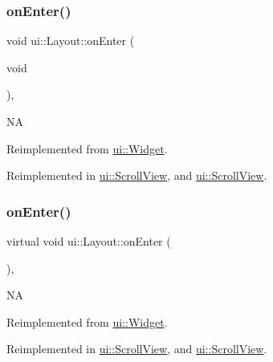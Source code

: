 \subsubsection{\texorpdfstring{on\+Enter()}{onEnter()}\hspace{0.1cm}{\footnotesize\ttfamily [1/2]}}
{\footnotesize\ttfamily void ui\+::\+Layout\+::on\+Enter (\begin{DoxyParamCaption}\item[{void}]{ }\end{DoxyParamCaption})\hspace{0.3cm}{\ttfamily [override]}, {\ttfamily [virtual]}}

NA 

Reimplemented from \hyperlink{classui_1_1Widget_a9cda9b9ffbf77a8ed695e6b97b9a46cc}{ui\+::\+Widget}.



Reimplemented in \hyperlink{classui_1_1ScrollView_afeb85b1cf1e420b57a66c97c08763138}{ui\+::\+Scroll\+View}, and \hyperlink{classui_1_1ScrollView_a1fb1c9ad9108d8c0102af82bfb7ef66d}{ui\+::\+Scroll\+View}.

\mbox{\label{classui_1_1Layout_ad3edf411791596999e99059861c0097a}} 
\subsubsection{\texorpdfstring{on\+Enter()}{onEnter()}\hspace{0.1cm}{\footnotesize\ttfamily [2/2]}}
{\footnotesize\ttfamily virtual void ui\+::\+Layout\+::on\+Enter (\begin{DoxyParamCaption}{ }\end{DoxyParamCaption})\hspace{0.3cm}{\ttfamily [override]}, {\ttfamily [virtual]}}

NA 

Reimplemented from \hyperlink{classui_1_1Widget_a9cda9b9ffbf77a8ed695e6b97b9a46cc}{ui\+::\+Widget}.



Reimplemented in \hyperlink{classui_1_1ScrollView_afeb85b1cf1e420b57a66c97c08763138}{ui\+::\+Scroll\+View}, and \hyperlink{classui_1_1ScrollView_a1fb1c9ad9108d8c0102af82bfb7ef66d}{ui\+::\+Scroll\+View}.

\mbox{\label{classui_1_1Layout_a6444f3e3f124723e75f80b3d36408e34}} 
